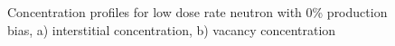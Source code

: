 \documentclass[a4paper]{article}
\begin{document}
    \begin{figure}[h!]  %
      \centering
      \qquad
      \caption{Concentration profiles for low dose rate neutron with 0\% production bias, a) interstitial concentration, b) vacancy concentration}
      \label{figure:concentrations_neutron_0_1e-6}
    \end{figure}
\end{document}
